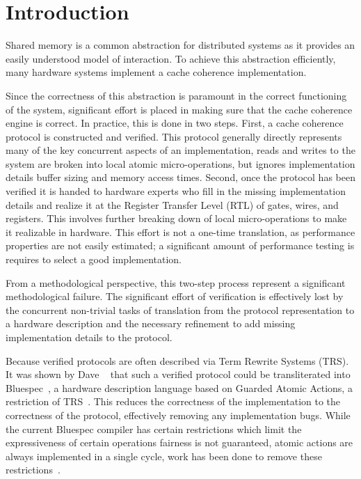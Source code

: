 \section{Introduction}
\label{sec:Introduction}

Shared memory is a common abstraction for distributed systems as it
provides an easily understood model of interaction. To achieve this
abstraction efficiently, many hardware systems implement a cache
coherence implementation. 

Since the correctness of this abstraction is paramount in the correct
functioning of the system, significant effort is placed in making sure
that the cache coherence engine is correct. In practice, this is done
in two steps. First, a cache coherence protocol is constructed and
verified. This protocol generally directly represents many of
the key concurrent aspects of an implementation, \eg{} reads and
writes to the system are broken into local atomic micro-operations, but
ignores implementation details \eg{} buffer sizing and memory access
times. Second, once the protocol has been verified it is handed to
hardware experts who fill in the missing implementation details and
realize it at the Register Transfer Level (RTL) of gates, wires, and
registers. This involves further breaking down of local micro-operations to
make it realizable in hardware. This effort is not a one-time translation, as
performance properties are not easily estimated; a significant amount of
performance testing is requires to select a good implementation. 

From a methodological perspective, this two-step process represent a
significant methodological failure. The significant effort of
verification is effectively lost by the concurrent non-trivial tasks
of translation from the protocol representation to a hardware
description and the necessary refinement to add missing implementation
details to the protocol. 

Because verified protocols are often described via Term Rewrite
Systems (TRS). It was shown by Dave
\etal{}~\cite{DNA:CoherenceImplementation} that such a verified
protocol could be transliterated into Bluespec~\cite{Bluespec:TFRG}, a
hardware description language based on Guarded Atomic Actions, a
restriction of TRS~\cite{Hoe:TCAD}. This reduces the correctness of
the implementation to the correctness of the protocol, effectively
removing any implementation bugs. While the current Bluespec compiler
has certain restrictions which limit the expressiveness of certain
operations \eg{} fairness is not guaranteed, atomic actions are always
implemented in a single cycle, work has been done to remove these
restrictions~\cite{DNA:CoherenceImplementation, Karczmarek}.

